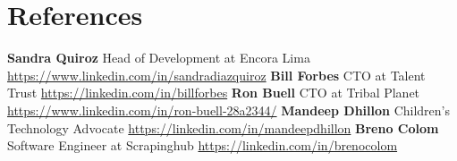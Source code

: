 \documentclass[11pt,a4paper,english]{moderncv}
\begin{document}
\section{References}
\cvlistitem
{
    \textbf{Sandra Quiroz}
    \newline{}
    Head of Development at Encora Lima
    \newline{}
    \url{https://www.linkedin.com/in/sandradiazquiroz}
}
\cvlistitem
{
    \textbf{Bill Forbes}
    \newline{}
    CTO at Talent Trust
    \newline{}
    \url{https://linkedin.com/in/billforbes}
}
\cvlistitem
{
    \textbf{Ron Buell}
    \newline{}
    CTO at Tribal Planet
    \newline{}
    \url{https://www.linkedin.com/in/ron-buell-28a2344/}
}
\cvlistitem
{
    \textbf{Mandeep Dhillon}
    \newline{}
    Children's Technology Advocate 
    \newline{}
    \url{https://linkedin.com/in/mandeepdhillon}
}
\cvlistitem
{
    \textbf{Breno Colom}
    \newline{}
    Software Engineer at Scrapinghub
    \newline{}
    \url{https://linkedin.com/in/brenocolom}
}
\end{document}
